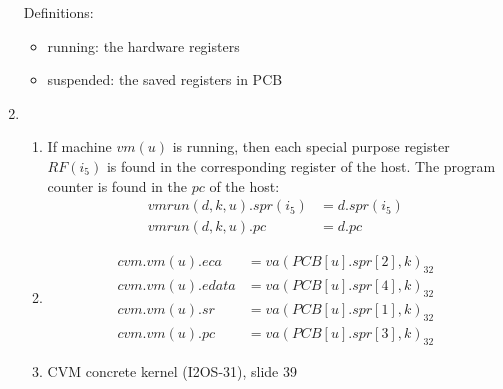 \documentclass{article}
\begin{document}
\begin{enumerate}
{\begin{enumerate}
{                    Definitions:
                    \begin{itemize}
                        \item running: the hardware registers
                        \item suspended: the saved registers in PCB
                    \end{itemize}
                }
            \end{enumerate}
        }
        \item {
            \begin{enumerate}
                \item {
                    If machine $vm(u)$ is running, then each special purpose register $RF(i_5)$ is found in the corresponding register of the host. The program counter is found in the $pc$ of the host:
                    \begin{displaymath}
                        \begin{aligned}
                            vmrun(d,k,u).spr(i_5) &= d.spr(i_5) \\
                            vmrun(d,k,u).pc &= d.pc
                        \end{aligned}
                    \end{displaymath}
                }
                \item {
                    \begin{displaymath}
                        \begin{aligned}
                            cvm.vm(u).eca &= va(PCB[u].spr[2], k)_{32} \\
                            cvm.vm(u).edata &= va(PCB[u].spr[4], k)_{32} \\
                            cvm.vm(u).sr &= va(PCB[u].spr[1], k)_{32} \\
                            cvm.vm(u).pc &= va(PCB[u].spr[3], k)_{32}
                        \end{aligned}
                    \end{displaymath}
                }
                \item {
                    CVM concrete kernel (I2OS-31), slide 39

}
\end{enumerate}}
\end{enumerate}
\end{document}
